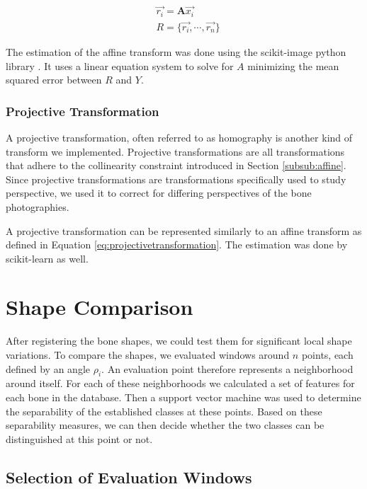 \documentclass[pdftex,12pt,a4paper]{report}
\begin{document}
\begin{equation}
\label{eq:projectivetransformation}
\begin{split}
& \vec{r_i} = \mathbf{A} \vec{x_i} \\
& R = \{ \vec{r_i}, \cdots, \vec{r_n} \}
\end{split}
\end{equation}

The estimation of the affine transform was done using the scikit-image python library \cite{van2014scikit}.
It uses a linear equation system to solve for $A$ minimizing the mean squared error between $R$ and $Y$.

\subsubsection{Projective Transformation}

A projective transformation, often referred to as homography is another kind of transform we implemented.
Projective transformations are all transformations that adhere to the collinearity constraint introduced
in Section \ref{subsub:affine}. Since projective transformations are transformations specifically used
to study perspective, we used it to correct for differing perspectives of the bone photographies.

A projective transformation can be represented similarly to an affine transform as defined in Equation
\ref{eq:projectivetransformation}. The estimation was done by scikit-learn \cite{van2014scikit} as well. 

\section{Shape Comparison}
\label{sec:shape-comparison}

After registering the bone shapes, we could test them for significant local shape variations. To compare the shapes, we evaluated windows around $n$ points, each defined by an angle $\rho_i$. An evaluation
point therefore represents a neighborhood around itself. For each of these neighborhoods
we calculated a set of features for each bone in the database. Then a support vector machine
was used to determine the separability of the established classes at these points. Based on 
these separability measures, we can then decide whether the two classes can be distinguished
at this point or not. 

\subsection{Selection of Evaluation Windows}
\end{document}
